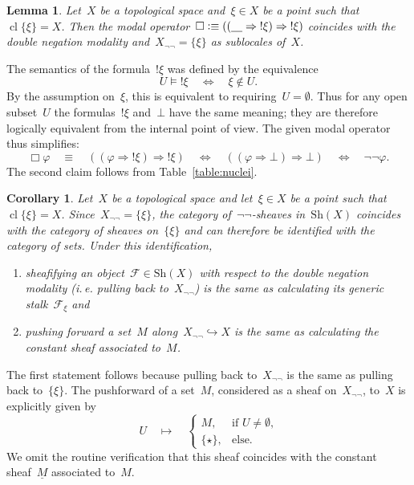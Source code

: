 \documentclass[10pt,reqno,a4paper]{amsbook}
\makeatletter
\theoremstyle{definition}
\theoremstyle{plain}
\newtheorem{cor}[defn]{Corollary}
\newtheorem{lemma}[defn]{Lemma}
\theoremstyle{remark}
\newcommand{\F}{\mathcal{F}}
\newcommand{\placeholder}{\underline{\quad}}
\newcommand{\Sh}{\mathrm{Sh}}
\DeclareMathOperator{\Clos}{cl}
\newcommand{\?}{\,{:}\,}
\renewcommand{\_}{\mathpunct{.}\,}
\newcommand{\notat}[1]{{!#1}}
\newcommand{\ie}{i.\,e.\@\xspace}
\newcommand{\defequiv}{\vcentcolon\equiv}
\renewenvironment{proof}[1][\proofname]{\par
  \pushQED{\qed}%
  \normalfont \topsep6\p@\@plus6\p@\relax
  \trivlist
  \item[\hskip\labelsep
        \itshape
    #1\@addpunct{.}]\ignorespaces
}{%
  \popQED\endtrivlist\@endpefalse
}
\makeatother
\begin{document}
\begin{lemma}\label{lemma:negneg-generic-point}
Let~$X$ be a topological space and~$\xi \in X$ be a point such
that~$\Clos\{\xi\} = X$. Then the modal operator~$\Box \defequiv ((\placeholder
\Rightarrow \notat{\xi}) \Rightarrow \notat{\xi})$ coincides with the double
negation modality and~$X_{\neg\neg} = \{\xi\}$ as sublocales of~$X$.\end{lemma}
\begin{proof}The semantics of the formula~$\notat{\xi}$ was defined by the
equivalence
\[ U \models \notat{\xi} \quad\Longleftrightarrow\quad
  \xi \not\in U. \]
By the assumption on~$\xi$, this is equivalent to requiring~$U = \emptyset$.
Thus for any open subset~$U$ the formulas~$\notat{\xi}$ and~$\bot$ have the
same meaning; they are therefore logically equivalent from the internal point of
view. The given modal operator thus simplifies:
\[ \Box\varphi \quad\equiv\quad ((\varphi \Rightarrow \notat{\xi}) \Rightarrow \notat{\xi})
  \quad\Leftrightarrow\quad ((\varphi \Rightarrow \bot) \Rightarrow \bot)
  \quad\Leftrightarrow\quad \neg\neg\varphi. \]
The second claim follows from Table~\ref{table:nuclei}.
\end{proof}

\begin{cor}\label{cor:negneg-generic-point-pushpull}
Let~$X$ be a topological space and let~$\xi \in X$ be a point such
that~$\Clos\{\xi\} = X$. Since~$X_{\neg\neg} = \{\xi\}$, the
category of~$\neg\neg$-sheaves in~$\Sh(X)$ coincides with the category of
sheaves on~$\{\xi\}$ and can therefore be identified with the category of sets.
Under this identification,
\begin{enumerate}
\item sheafifying an object~$\F \in \Sh(X)$ with respect
to the double negation modality (\ie pulling back to~$X_{\neg\neg}$) is the
same as calculating its generic stalk~$\F_\xi$ and
\item pushing forward a set~$M$ along~$X_{\neg\neg} \hookrightarrow X$ is the
same as calculating the constant sheaf associated to~$M$.
\end{enumerate}
\end{cor}
\begin{proof}The first statement follows because pulling back to~$X_{\neg\neg}$
is the same as pulling back to~$\{\xi\}$. The pushforward of a set~$M$,
considered as a sheaf on~$X_{\neg\neg}$, to~$X$ is explicitly given by
\[ U \quad\longmapsto\quad \begin{cases}
  M, & \text{if $U \neq \emptyset$,} \\
  \{\star\}, & \text{else.}
\end{cases} \]
We omit the routine verification that this sheaf coincides with the constant
sheaf~$\underline{M}$ associated to~$M$.
\end{proof}
\end{document}
